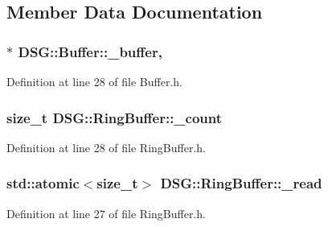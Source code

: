\subsection{Member Data Documentation}
\hypertarget{classDSG_1_1Buffer_a6506d4763401650acb463cb5d4913e31}{
\subsubsection[{\+\_\+buffer}]{$\ast$ D\+S\+G\+::\+Buffer\+::\+\_\+buffer\hspace{0.3cm}{\ttfamily [protected]}, {\ttfamily [inherited]}}}\label{classDSG_1_1Buffer_a6506d4763401650acb463cb5d4913e31}


Definition at line 28 of file Buffer.\+h.

\hypertarget{classDSG_1_1RingBuffer_af6d0e1658a1f1aa298218b890e458f2f}{
\subsubsection[{\+\_\+count}]{\setlength{\rightskip}{0pt plus 5cm}size\+\_\+t D\+S\+G\+::\+Ring\+Buffer\+::\+\_\+count\hspace{0.3cm}{\ttfamily [protected]}}}\label{classDSG_1_1RingBuffer_af6d0e1658a1f1aa298218b890e458f2f}


Definition at line 28 of file Ring\+Buffer.\+h.

\hypertarget{classDSG_1_1RingBuffer_aa71bb75a5d24700be795a30e1a135a54}{
\subsubsection[{\+\_\+read}]{\setlength{\rightskip}{0pt plus 5cm}std\+::atomic$<$size\+\_\+t$>$ D\+S\+G\+::\+Ring\+Buffer\+::\+\_\+read\hspace{0.3cm}{\ttfamily [protected]}}}\label{classDSG_1_1RingBuffer_aa71bb75a5d24700be795a30e1a135a54}


Definition at line 27 of file Ring\+Buffer.\+h.


